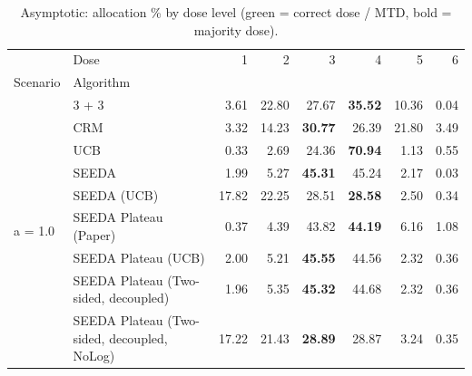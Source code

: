 \begin{table}[H]
\centering
\caption{Asymptotic: allocation \% by dose level (green = correct dose / MTD, bold = majority dose).}
\label{tab:asym_alloc_by_dose}
\begin{tabular}{llrrrrrr}
\toprule
 & Dose & 1 & 2 & 3 & 4 & 5 & 6 \\
Scenario & Algorithm &  &  &  &  &  &  \\
\midrule
\multirow[c]{9}{*}{a = 1.0} & 3 + 3 & 3.61 & 22.80 & {\cellcolor[HTML]{C8E6C9}} 27.67 & \bfseries 35.52 & 10.36 & 0.04 \\
 & CRM & 3.32 & 14.23 & {\cellcolor[HTML]{C8E6C9}} \bfseries 30.77 & 26.39 & 21.80 & 3.49 \\
 & UCB & 0.33 & 2.69 & {\cellcolor[HTML]{C8E6C9}} 24.36 & \bfseries 70.94 & 1.13 & 0.55 \\
 & SEEDA & 1.99 & 5.27 & {\cellcolor[HTML]{C8E6C9}} \bfseries 45.31 & 45.24 & 2.17 & 0.03 \\
 & SEEDA (UCB) & 17.82 & 22.25 & {\cellcolor[HTML]{C8E6C9}} 28.51 & \bfseries 28.58 & 2.50 & 0.34 \\
 & SEEDA Plateau (Paper) & 0.37 & 4.39 & {\cellcolor[HTML]{C8E6C9}} 43.82 & \bfseries 44.19 & 6.16 & 1.08 \\
 & SEEDA Plateau (UCB) & 2.00 & 5.21 & {\cellcolor[HTML]{C8E6C9}} \bfseries 45.55 & 44.56 & 2.32 & 0.36 \\
 & SEEDA Plateau (Two-sided, decoupled) & 1.96 & 5.35 & {\cellcolor[HTML]{C8E6C9}} \bfseries 45.32 & 44.68 & 2.32 & 0.36 \\
 & SEEDA Plateau (Two-sided, decoupled, NoLog) & 17.22 & 21.43 & {\cellcolor[HTML]{C8E6C9}} \bfseries 28.89 & 28.87 & 3.24 & 0.35 \\
\bottomrule
\end{tabular}
\end{table}
